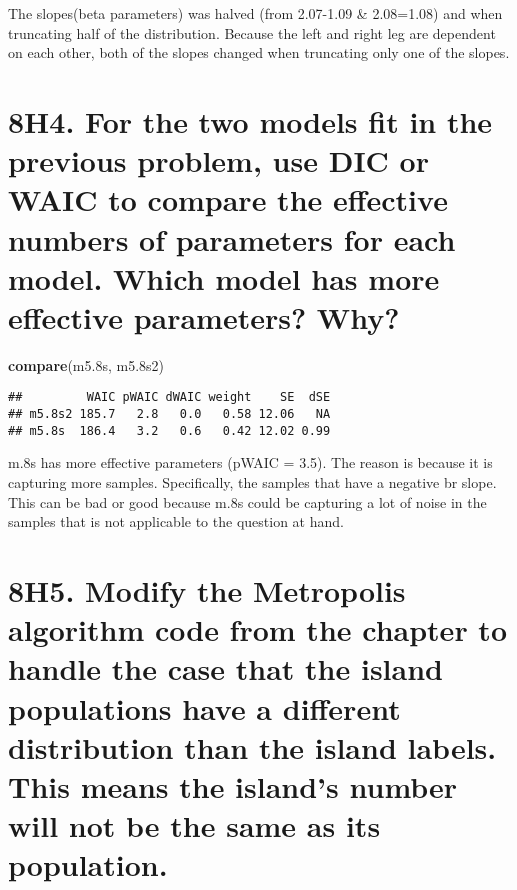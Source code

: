 \documentclass[]{article}
\newenvironment{Shaded}{\begin{snugshade}}{\end{snugshade}}
\newcommand{\KeywordTok}[1]{\textcolor[rgb]{0.13,0.29,0.53}{\textbf{#1}}}
\newcommand{\NormalTok}[1]{#1}
\begin{document}
The slopes(beta parameters) was halved (from 2.07-1.09 \& 2.08=1.08) and
when truncating half of the distribution. Because the left and right leg
are dependent on each other, both of the slopes changed when truncating
only one of the slopes.

\section{8H4. For the two models fit in the previous problem, use DIC or
WAIC to compare the effective numbers of parameters for each model.
Which model has more effective parameters?
Why?}\label{h4.-for-the-two-models-fit-in-the-previous-problem-use-dic-or-waic-to-compare-the-effective-numbers-of-parameters-for-each-model.-which-model-has-more-effective-parameters-why}

\begin{Shaded}
\begin{Highlighting}[]
\KeywordTok{compare}\NormalTok{(m5.8s, m5.8s2)}
\end{Highlighting}
\end{Shaded}

\begin{verbatim}
##         WAIC pWAIC dWAIC weight    SE  dSE
## m5.8s2 185.7   2.8   0.0   0.58 12.06   NA
## m5.8s  186.4   3.2   0.6   0.42 12.02 0.99
\end{verbatim}

m.8s has more effective parameters (pWAIC = 3.5). The reason is because
it is capturing more samples. Specifically, the samples that have a
negative br slope. This can be bad or good because m.8s could be
capturing a lot of noise in the samples that is not applicable to the
question at hand.

\section{8H5. Modify the Metropolis algorithm code from the chapter to
handle the case that the island populations have a different
distribution than the island labels. This means the island's number will
not be the same as its
population.}\label{h5.-modify-the-metropolis-algorithm-code-from-the-chapter-to-handle-the-case-that-the-island-populations-have-a-different-distribution-than-the-island-labels.-this-means-the-islands-number-will-not-be-the-same-as-its-population.}
\end{document}
